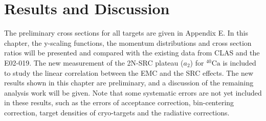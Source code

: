 \chapter{Results and Discussion}
  The preliminary cross sections for all targets are given in Appendix E. In this chapter, the y-scaling functions, the momentum distributions and cross section ratios will be presented and compared with the existing data from CLAS and the E02-019. The new measurement of the 2N-SRC plateau ($a_{2}$) for $\mathrm{^{40}Ca}$ is included to study the linear correlation between the EMC and the SRC effects. The new results shown in this chapter are preliminary, and a discussion of the remaining analysis work will be given. Note that some systematic errors are not yet included in these results, such as the errors of acceptance correction, bin-centering correction, target densities of cryo-targets and the radiative corrections.

